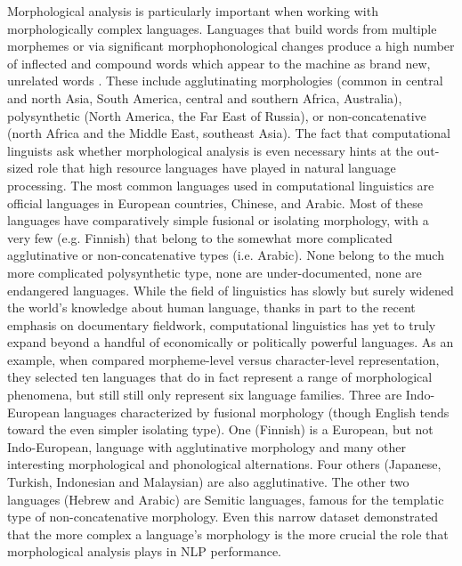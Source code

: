 \documentclass[12pt]{article}
\begin{document}
Morphological analysis is particularly important when working with morphologically complex languages.  Languages that build words from multiple morphemes or via significant morphophonological changes produce a high number of inflected and compound words which appear to the machine as brand new, unrelated words \cite{dreyer_discovering_2011,goldsmith_computational_2017,hammarstrom_unsupervised_2011,kann_neural_2016,ruokolainen_supervised_2013}. These include agglutinating morphologies (common in central and north Asia, South America, central and southern Africa, Australia), polysynthetic (North America, the Far East of Russia), or non-concatenative (north Africa and the Middle East, southeast Asia). The fact that computational linguists ask whether morphological analysis is even necessary hints at the out-sized role that high resource languages have played in natural language processing. The most common languages used in computational linguistics are official languages in European countries, Chinese, and Arabic. Most of these languages have comparatively simple fusional or isolating morphology, with a very few (e.g. Finnish) that belong to the somewhat more complicated agglutinative or non-concatenative types (i.e. Arabic). None belong to the much more complicated polysynthetic type, none are under-documented, none are endangered languages. While the field of linguistics has slowly but surely widened the world's knowledge about human language, thanks in part to the recent emphasis on documentary fieldwork, computational linguistics has yet to truly expand beyond a handful of economically or politically powerful languages. As an example, when  compared morpheme-level versus character-level representation, they selected ten languages that do in fact represent a range of morphological phenomena, but still still only represent six language families. Three are Indo-European languages characterized by fusional morphology (though English tends toward the even simpler isolating type). One (Finnish) is a European, but not Indo-European, language with agglutinative morphology and many other interesting morphological and phonological alternations. Four others (Japanese, Turkish, Indonesian and Malaysian) are also agglutinative. The other two languages (Hebrew and Arabic) are Semitic languages, famous for the templatic type of non-concatenative morphology. Even this narrow dataset demonstrated that the more complex a language’s morphology is the more crucial the role that morphological analysis plays in NLP performance. 
 
\end{document}
